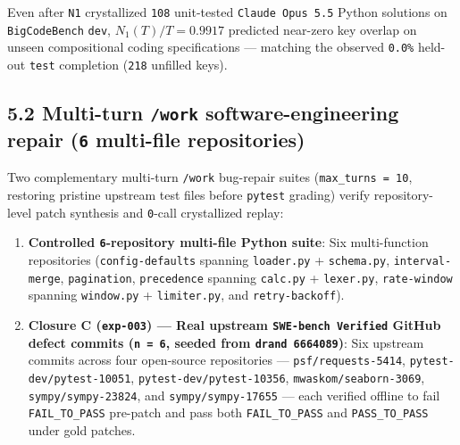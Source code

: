 \documentclass[10pt,letterpaper]{article}
\providecommand{\tightlist}{\setlength{\itemsep}{1pt}\setlength{\parskip}{0pt}}
\begin{document}
Even after \texttt{N1} crystallized \texttt{108} unit-tested
\texttt{Claude\ Opus\ 5.\allowbreak{}5} Python solutions on \texttt{BigCodeBench}
\texttt{dev}, \(N_1(T)/T = 0.9917\) predicted near-zero key overlap on
unseen compositional coding specifications --- matching the observed
\texttt{0.0\%} held-out \texttt{test} completion (\texttt{218} unfilled
keys).

\subsection{\texorpdfstring{5.2 Multi-turn \texttt{/work}
software-engineering repair (\texttt{6} multi-file
repositories)}{5.2 Multi-turn /work software-engineering repair (6 multi-file repositories)}}\label{multi-turn-work-software-engineering-repair-6-multi-file-repositories}

Two complementary multi-turn \texttt{/work} bug-repair suites
(\texttt{max\_\allowbreak{}turns\ =\ 10}, restoring pristine upstream test files
before \texttt{pytest} grading) verify repository-level patch synthesis
and \texttt{0}-call crystallized replay:

\begin{enumerate}
\def\labelenumi{\arabic{enumi}.}
\tightlist
\item
  \textbf{Controlled \texttt{6}-repository multi-file Python suite}: Six
  multi-function repositories (\texttt{config-\allowbreak{}defaults} spanning
  \texttt{loader.py} + \texttt{schema.py}, \texttt{interval-\allowbreak{}merge},
  \texttt{pagination}, \texttt{precedence} spanning \texttt{calc.py} +
  \texttt{lexer.py}, \texttt{rate-\allowbreak{}window} spanning \texttt{window.py} +
  \texttt{limiter.\allowbreak{}py}, and \texttt{retry-\allowbreak{}backoff}).
\item
  \textbf{Closure C (\texttt{exp-003}) --- Real upstream
  \texttt{SWE-\allowbreak{}bench\ Verified} GitHub defect commits (\texttt{n\ =\ 6},
  seeded from \texttt{drand\ 6664089})}: Six upstream commits across
  four open-source repositories --- \texttt{psf/\allowbreak{}requests-\allowbreak{}5414},
  \texttt{pytest-\allowbreak{}dev/\allowbreak{}pytest-\allowbreak{}10051}, \texttt{pytest-\allowbreak{}dev/\allowbreak{}pytest-\allowbreak{}10356},
  \texttt{mwaskom/\allowbreak{}seaborn-\allowbreak{}3069}, \texttt{sympy/\allowbreak{}sympy-\allowbreak{}23824}, and
  \texttt{sympy/\allowbreak{}sympy-\allowbreak{}17655} --- each verified offline to fail
  \texttt{FAIL\_\allowbreak{}TO\_\allowbreak{}PASS} pre-patch and pass both
  \texttt{FAIL\_\allowbreak{}TO\_\allowbreak{}PASS} and \texttt{PASS\_\allowbreak{}TO\_\allowbreak{}PASS} under gold
  patches.
\end{enumerate}
\end{document}
